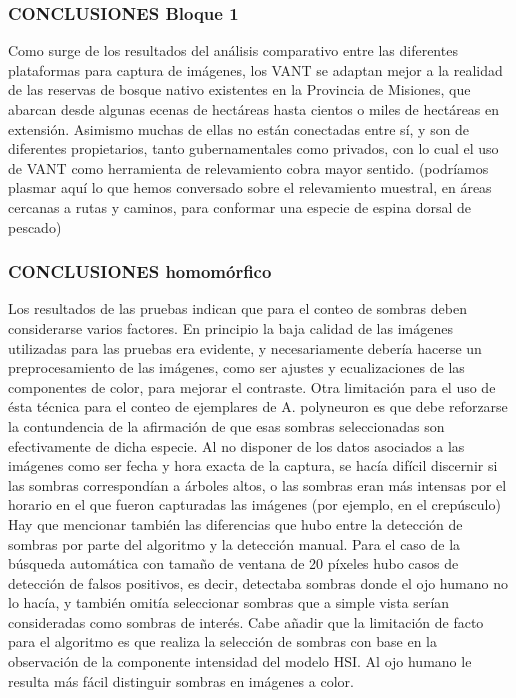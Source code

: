 \color{black} 
\subsubsection{CONCLUSIONES Bloque 1}
Como surge de los resultados del análisis comparativo entre las diferentes plataformas para captura de imágenes, los VANT se adaptan mejor a la realidad de las reservas de bosque nativo existentes en la Provincia de Misiones, que abarcan desde algunas ecenas de hectáreas hasta cientos o miles de hectáreas en extensión. Asimismo muchas de ellas no están conectadas entre sí, y son de diferentes propietarios, tanto gubernamentales como privados, con lo cual el uso de VANT como herramienta de relevamiento cobra mayor sentido. \color{magenta}(podríamos plasmar aquí lo que hemos conversado sobre el relevamiento muestral, en áreas cercanas a rutas y caminos, para conformar una especie de espina dorsal de pescado)
\color{black} 
\subsubsection{CONCLUSIONES homomórfico}
Los resultados de las pruebas indican que para el conteo de sombras deben considerarse varios factores. En principio la baja calidad de las imágenes utilizadas para las pruebas era evidente, y necesariamente debería hacerse un preprocesamiento de las imágenes, como ser ajustes y ecualizaciones de las componentes de color, para mejorar el contraste. Otra limitación para el uso de ésta técnica para el conteo de ejemplares de A. polyneuron es que debe reforzarse la contundencia de la afirmación de que esas sombras seleccionadas son efectivamente de dicha especie. Al no disponer de los datos asociados a las imágenes como ser fecha y hora exacta de la captura, se hacía difícil discernir si las sombras correspondían a árboles altos, o las sombras eran más intensas por el horario en el que fueron capturadas las imágenes (por ejemplo, en el crepúsculo) Hay que mencionar también las diferencias que hubo entre la detección de sombras por parte del algoritmo y la detección manual. Para el caso de la búsqueda automática con tamaño de ventana de 20 píxeles hubo casos de detección de falsos positivos, es decir, detectaba sombras donde el ojo humano no lo hacía, y también omitía seleccionar sombras que a simple vista serían consideradas como sombras de interés. Cabe añadir que la limitación de facto para el algoritmo es que realiza la selección de sombras con base en la observación de la componente intensidad del modelo HSI. Al ojo humano le resulta más fácil distinguir sombras en imágenes a color.


